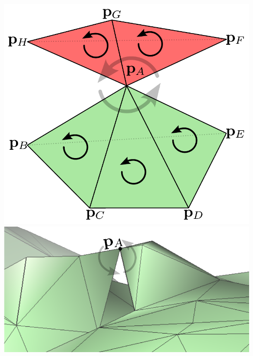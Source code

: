 \documentclass[aspectratio=169,t]{beamer}
\begin{document}
{\begin{columns}[T]
\begin{column}{.5\textwidth}
{\begin{columns}[T]
					\begin{column}{.35\textwidth}
						\centering
						\includegraphics[width=\linewidth]{figures/badMesh1.png}
						\includegraphics[width=\linewidth]{figures/badMesh2.png}

\end{column}
\end{columns}}
\end{column}
\end{columns}}
\end{document}
